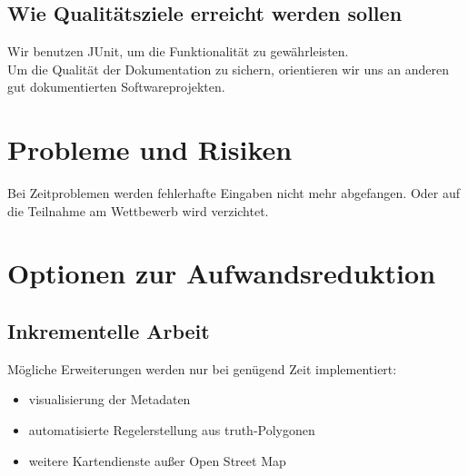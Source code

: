 \subsection{Wie Qualitätsziele erreicht werden sollen}
Wir benutzen JUnit, um die Funktionalität zu gewährleisten.\\
Um die Qualität der Dokumentation zu sichern, orientieren wir uns an anderen gut dokumentierten Softwareprojekten.
\section{Probleme und Risiken}
Bei Zeitproblemen werden fehlerhafte Eingaben nicht mehr abgefangen. Oder auf die Teilnahme am Wettbewerb wird verzichtet.
\section{Optionen zur Aufwandsreduktion}
\subsection{Inkrementelle Arbeit}
Mögliche Erweiterungen werden nur bei genügend Zeit implementiert:
\begin{itemize}
 \item visualisierung der Metadaten
 \item automatisierte Regelerstellung aus truth-Polygonen
 \item weitere Kartendienste außer Open Street Map
\end{itemize}
